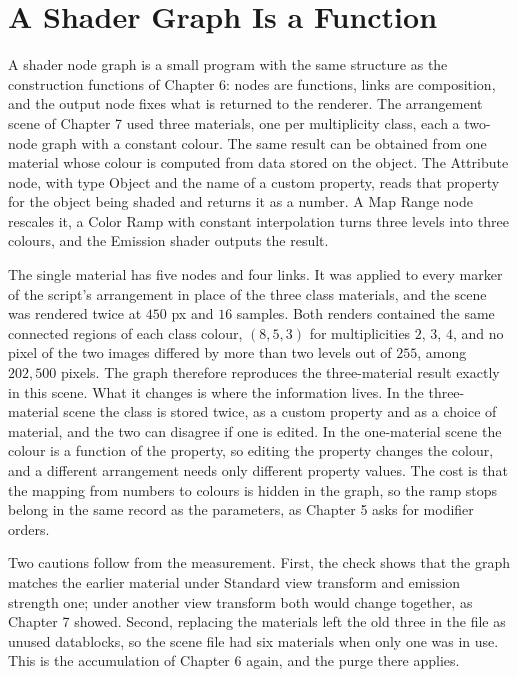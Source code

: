 \section{A Shader Graph Is a Function}

A shader node graph is a small program with the same structure as the construction functions of Chapter 6: nodes are functions, links are composition, and the output node fixes what is returned to the renderer. The arrangement scene of Chapter 7 used three materials, one per multiplicity class, each a two-node graph with a constant colour. The same result can be obtained from one material whose colour is computed from data stored on the object. The Attribute node, with type Object and the name of a custom property, reads that property for the object being shaded and returns it as a number. A Map Range node rescales it, a Color Ramp with constant interpolation turns three levels into three colours, and the Emission shader outputs the result.



The single material has five nodes and four links. It was applied to every marker of the script's arrangement in place of the three class materials, and the scene was rendered twice at $450$ px and $16$ samples. Both renders contained the same connected regions of each class colour, $(8,5,3)$ for multiplicities $2$, $3$, $4$, and no pixel of the two images differed by more than two levels out of $255$, among $202{,}500$ pixels. The graph therefore reproduces the three-material result exactly in this scene. What it changes is where the information lives. In the three-material scene the class is stored twice, as a custom property and as a choice of material, and the two can disagree if one is edited. In the one-material scene the colour is a function of the property, so editing the property changes the colour, and a different arrangement needs only different property values. The cost is that the mapping from numbers to colours is hidden in the graph, so the ramp stops belong in the same record as the parameters, as Chapter 5 asks for modifier orders.

Two cautions follow from the measurement. First, the check shows that the graph matches the earlier material under Standard view transform and emission strength one; under another view transform both would change together, as Chapter 7 showed. Second, replacing the materials left the old three in the file as unused datablocks, so the scene file had six materials when only one was in use. This is the accumulation of Chapter 6 again, and the purge there applies.

